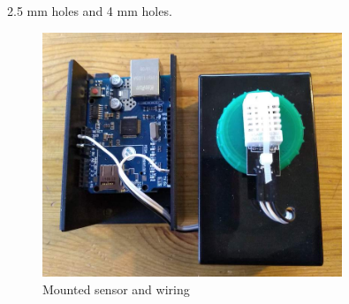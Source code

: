 \documentclass[a4paper, 12pt]{article}
\begin{document}
2.5 mm holes and 4 mm holes.

\begin{figure}[H]
  \centering
  \includegraphics[width=0.8\textwidth]{packaging.jpg}
  \caption{Mounted sensor and wiring}
\end{figure}
\end{document}
